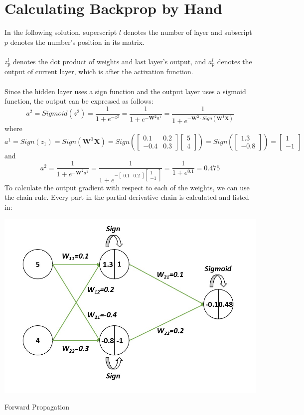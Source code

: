 \documentclass{article}
\begin{document}
    \section{Calculating Backprop by Hand}
    	In the following solution, superscript $l$ denotes the number of layer and subscript $p$ denotes the number's position in its matrix. \\\\
    	$z^l_p$ denotes the dot product of weights and last layer's output, and $a^l_p$ denotes the output of current layer, which is after the activation function.\\\\
    	Since the hidden layer uses a sign function and the output layer uses a sigmoid function, the output can be expressed as follows:
    	$$a^2=
    	Sigmoid(z^2)=
    	\dfrac{1}{1+e^{-z^2}}=
    	\dfrac{1}{1+e^{-\boldsymbol{W^2}a^1}}=
    	\dfrac{1}{1+e^{-\boldsymbol{W^2}\cdot Sign(\boldsymbol{W^1}\boldsymbol{X})}}$$
    	where
    	$$a^1=
    	Sign(z_1)=
    	Sign(\boldsymbol{W^1}\boldsymbol{X})=
    	Sign(\begin{bmatrix}0.1 & 0.2\\-0.4 & 0.3\end{bmatrix} \begin{bmatrix}5\\4\end{bmatrix})=
    	Sign(\begin{bmatrix}1.3\\-0.8\end{bmatrix})=
    	\begin{bmatrix}1\\-1\end{bmatrix}$$
    	and
    	$$a^2=
    	\dfrac{1}{1+e^{-\boldsymbol{W^2}a^1}}=
    	\dfrac{1}{1+e^{-\begin{bmatrix}0.1&0.2\end{bmatrix}\begin{bmatrix}1\\-1\end{bmatrix}}}=
    	\dfrac{1}{1+e^{0.1}}=0.475$$
    	To calculate the output gradient with respect to each of the weights, we can use the chain rule. Every part in the partial derivative chain is calculated and listed in:\\
    	\begin{minipage}[t]{\linewidth}
        		\captionsetup{type=figure}
               	\centering
               	\includegraphics[width=0.6\linewidth]
                				{images/Q2a.jpg}
                \caption{Forward Propagation}      
        \end{minipage}
\end{document}
